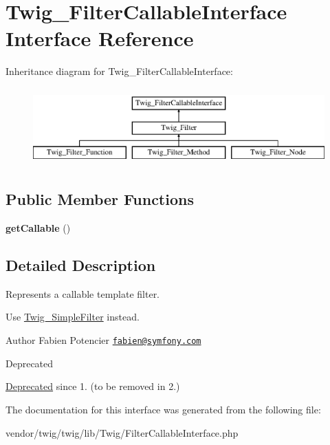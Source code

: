 \hypertarget{interfaceTwig__FilterCallableInterface}{}\section{Twig\+\_\+\+Filter\+Callable\+Interface Interface Reference}
\label{interfaceTwig__FilterCallableInterface}
Inheritance diagram for Twig\+\_\+\+Filter\+Callable\+Interface\+:\begin{figure}[H]
\begin{center}
\leavevmode
\includegraphics[height=3.000000cm]{interfaceTwig__FilterCallableInterface}
\end{center}
\end{figure}
\subsection*{Public Member Functions}
\begin{DoxyCompactItemize}
\item 
{\bfseries get\+Callable} ()\hypertarget{interfaceTwig__FilterCallableInterface_afc7bd0095dc1936d507f2e966ccb1418}{}\label{interfaceTwig__FilterCallableInterface_afc7bd0095dc1936d507f2e966ccb1418}

\end{DoxyCompactItemize}


\subsection{Detailed Description}
Represents a callable template filter.

Use \hyperlink{classTwig__SimpleFilter}{Twig\+\_\+\+Simple\+Filter} instead.

\begin{DoxyAuthor}{Author}
Fabien Potencier \href{mailto:fabien@symfony.com}{\tt fabien@symfony.\+com}
\end{DoxyAuthor}
\begin{DoxyRefDesc}{Deprecated}
\item[\hyperlink{deprecated__deprecated000021}{Deprecated}]since 1. (to be removed in 2.) \end{DoxyRefDesc}


The documentation for this interface was generated from the following file\+:\begin{DoxyCompactItemize}
\item 
vendor/twig/twig/lib/\+Twig/Filter\+Callable\+Interface.\+php\end{DoxyCompactItemize}
